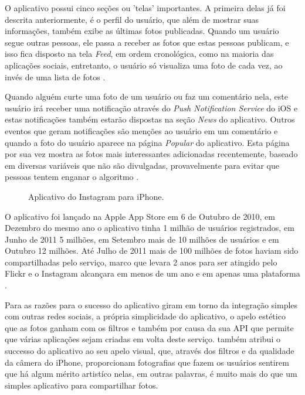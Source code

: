 \documentclass[diss]{template/setrem}
\begin{document}
O aplicativo possui cinco seções ou 'telas' importantes. A primeira delas já foi descrita anteriormente, é o perfil do usuário, que além de mostrar suas informações, também exibe as últimas fotos publicadas. Quando um usuário segue outras pessoas, ele passa a receber as fotos que estas pessoas publicam, e isso fica disposto na tela \emph{Feed}, em ordem cronológica, como na maioria das aplicações sociais, entretanto, o usuário só visualiza uma foto de cada vez, ao invés de uma lista de fotos \citep{Instagram2012}.

Quando alguém curte uma foto de um usuário ou faz um comentário nela, este usuário irá receber uma notificação através do \emph{Push Notification Service} do iOS e estas notificações também estarão dispostas na seção \emph{News} do aplicativo. Outros eventos que geram notificações são menções ao usuário em um comentário e quando a foto do usuário aparece na página \emph{Popular} do aplicativo. Esta página por sua vez mostra as fotos mais interessantes adicionadas recentemente, baseado em diversas variáveis que não são divulgadas, provavelmente para evitar que pessoas tentem enganar o algoritmo \citep{Instagram2012}.

\begin{figure}[!h]
    \caption{Aplicativo do Instagram para iPhone.}
    \label{fig:instagram}
\end{figure}

O aplicativo foi lançado na Apple App Store em 6 de Outubro de 2010, em Dezembro do mesmo ano o aplicativo tinha 1 milhão de usuários registrados, em Junho de 2011 5 milhões, em Setembro mais de 10 milhões de usuários e em Outubro 12 milhões. Até Julho de 2011 mais de 100 milhões de fotos haviam sido compartilhadas pelo serviço, marco que levara 2 anos para ser atingido pelo Flickr e o Instagram alcançara em menos de um ano e em apenas uma plataforma \citep{Viticci2011, Siegler2011a, Tsotsis2011}.

Para \citet{Stratmann2011} as razões para o sucesso do aplicativo giram em torno da integração simples com outras redes sociais, a própria simplicidade do aplicativo, o apelo estético que as fotos ganham com os filtros e também por causa da sua API que permite que várias aplicações sejam criadas em volta deste serviço. \citet{Bolt2011} também atribui o successo do aplicativo ao seu apelo visual, que, através dos filtros e da qualidade da câmera do iPhone, proporcionam fotografias que fazem os usuários sentirem que há algum mérito artistíco nelas, em outras palavras, é muito mais do que um simples aplicativo para compartilhar fotos.
\end{document}
